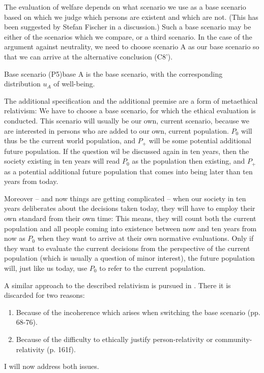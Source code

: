 The evaluation of welfare depends on what scenario we use as a base scenario based on which we judge which persons are existent and which are not. (This has been suggested by Stefan Fischer in a discussion.) Such a base scenario may be either of the scenarios which we compare, or a third scenario. In the case of the argument against neutrality, we need to choose scenario A as our base scenario so that we can arrive at the alternative conclusion (C8’). 

\begin{Premise}{Base scenario (P5)}{base}
A is the base scenario, with the corresponding distribution $u_A$ of well-being.
\end{Premise}

The additional specification and the additional premise are a form of metaethical relativism: We have to choose a base scenario, for which the ethical evaluation is conducted. This scenario will usually be our own, current scenario, because we are interested in persons who are added to our own, current population. $P_0$ will thus be the current world population, and $P_+$ will be some potential additional future population. If the question wil be discussed again in ten years, then the society existing in ten years will read $P_0$ as the population then existing, and $P_+$ as a potential additional future population that comes into being later than ten years from today. 

Moreover -- and now things are getting complicated -- when our society in ten years deliberates about the decisions taken today, they will have to employ their own standard from their own time: This means, they will count both the current population and all people coming into existence between now and ten years from now as $P_0$ when they want to arrive at their own normative evaluations. Only if they want to evaluate the current decisions from the perspective of the current population (which is usually a question of minor interest), the future population will, just like us today, use $P_0$ to refer to the current population. 

A similar approach to the described relativism is pursued in . There it is discarded for two reasons:
\begin{enumerate}
\item Because of the incoherence which arises when switching the base scenario (pp. 68-76). 
\item Because of the difficulty to ethically justify person-relativity or com\-mu\-ni\-ty-relativity (p. 161f). 
\end{enumerate}
I will now address both issues.  

